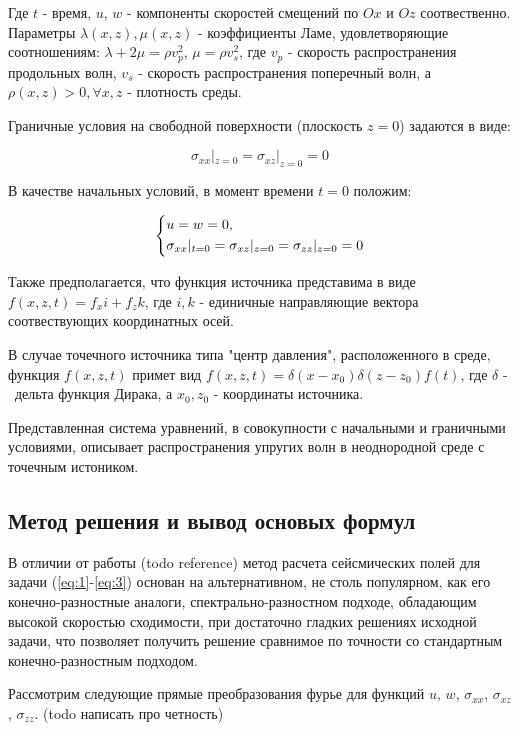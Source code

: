 Где $t$ - время, $u$, $w$ - компоненты скоростей смещений по $Ox$ и $Oz$ соотвественно.
Параметры $\lambda(x,z), \mu(x,z)$ - коэффициенты Ламе, удовлетворяющие соотношениям: $\lambda + 2\mu=\rho{v}_p^2$, $\mu=\rho{v}_s^2$, 
где $v_p$ - скорость распространения продольных волн, $v_s$ - скорость распространения поперечный волн,
а $\rho(x,z)>0, \forall x,z$ - плотность среды.

Граничные условия на свободной поверхности (плоскость $z = 0$) задаются в виде:

\begin{equation}
	\label{eq:2}
	\sigma_{xx}|_{z=0}=\sigma_{xz}|_{z=0}=0
\end{equation}

В качестве начальных условий, в момент времени $t=0$ положим:

\begin{equation}
\begin{dcases}
	\label{eq:3}
	u = w = 0, \\
	\sigma_{xx}|_{t=0}=\sigma_{xz}|_{z=0}=\sigma_{zz}|_{z=0}=0
\end{dcases}
\end{equation}

Также предполагается, что функция источника представима в виде $f(x,z,t)=f_xi+f_zk$,
где $i, k$ - единичные направляющие вектора соотвествующих координатных осей.

В случае точечного источника типа "центр давления", расположенного в среде, функция $f(x,z,t)$ примет вид $f(x,z,t)=\delta(x-x_0)\delta(z-z_0)f(t)$,
где $\delta$ -  дельта функция Дирака, а $x_0, z_0$ - координаты источника.

Представленная система уравнений, в совокупности с начальными и граничными условиями,
описывает распространения упругих волн в неоднородной среде с точечным истоником.

\subsection{Метод решения и вывод основых формул}
В отличии от работы (todo reference) метод расчета сейсмических полей для задачи (\ref{eq:1}-\ref{eq:3}) основан на альтернативном,
не столь популярном, как его конечно-разностные аналоги, спектрально-разностном подходе, обладающим высокой скоростью сходимости,
при достаточно гладких решениях исходной задачи, что позволяет получить решение сравнимое по точности со стандартным
конечно-разностным подходом.

Рассмотрим следующие прямые преобразования фурье для функций $u$, $w$, $\sigma_{xx}$, $\sigma_{xz}$, $\sigma_{zz}$.
(todo написать про четность)

